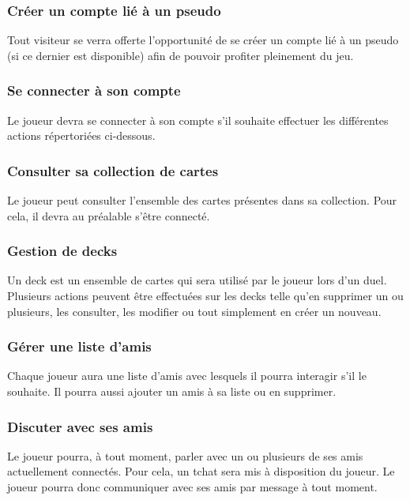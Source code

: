 \documentclass[11pt,a4paper]{article}
\begin{document}
\subsubsection{Créer un compte lié à un pseudo}

Tout visiteur se verra offerte l'opportunité de se créer un compte
lié à un pseudo (si ce dernier est disponible) afin de pouvoir
profiter pleinement du jeu.

\subsubsection{Se connecter à son compte}

Le joueur devra se connecter à son compte s'il souhaite effectuer
les différentes actions répertoriées ci-dessous.

\subsubsection{Consulter sa collection de cartes}

Le joueur peut consulter l'ensemble des cartes présentes dans sa
collection. Pour cela, il devra au préalable s'être connecté.

\subsubsection{Gestion de decks}

Un deck est un ensemble de cartes qui sera utilisé par le joueur
lors d'un duel. Plusieurs actions peuvent être effectuées sur les
decks telle qu'en supprimer un ou plusieurs, les consulter, les
modifier ou tout simplement en créer un nouveau.

\subsubsection{Gérer une liste d'amis}

Chaque joueur aura une liste d'amis avec lesquels il pourra
interagir s'il le souhaite. Il pourra aussi ajouter un amis à sa
liste ou en supprimer.

\subsubsection{Discuter avec ses amis}

Le joueur pourra, à tout moment, parler avec un ou plusieurs de ses
amis actuellement connectés. Pour cela, un tchat sera mis à
disposition du joueur.  Le joueur pourra donc communiquer avec ses
amis par message à tout moment.
\end{document}
